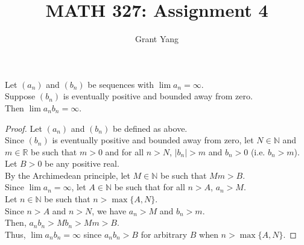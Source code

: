 \documentclass{article}
\newenvironment{theorem}[1]{\renewcommand\theinnercustomthm{#1}\innercustomthm}
  {\endinnercustomthm}
\begin{document}
\title{MATH 327: Assignment 4}
\author{Grant Yang}
\maketitle


\begin{theorem}1
    Let $(a_n)$ and $(b_n)$ be sequences with $\lim a_n = \infty$. \\
    Suppose $(b_n)$ is eventually positive and bounded away from zero. \\
    Then $\lim a_n b_n = \infty$.
\end{theorem}
\begin{proof}
    Let $(a_n)$ and $(b_n)$ be defined as above. \\
    Since $(b_n)$ is eventually positive and bounded away from zero, let $N \in \mathbb N$ and $m \in \mathbb R$ be such that $m>0$ and for all $n > N$, $|b_n| > m$ and $b_n > 0$ (i.e. $b_n > m$). \\
    Let $B > 0$ be any positive real. \\
    By the Archimedean principle, let $M \in \mathbb N$ be such that $M m > B$. \\
    Since $\lim a_n = \infty$, let $A \in \mathbb N$ be such that for all $n > A$, $a_n > M$. \\
    Let $n \in \mathbb N$ be such that $n > \max \{A, N\}$. \\
    Since $n > A$ and $n > N$, we have $a_n > M$ and $b_n > m$. \\
    Then, $a_n b_n > M b_n > M m > B$. \\
    Thus, $\lim a_n b_n = \infty$ since $a_nb_n > B$ for arbitrary $B$ when $n > \max \{A, N\}$.
\end{proof}
\end{document}
